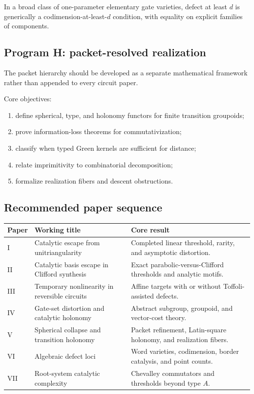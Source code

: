 \begin{conjecture}
In a broad class of one-parameter elementary gate varieties, defect at least $d$ is generically a codimension-at-least-$d$ condition, with equality on explicit families of components.
\end{conjecture}

\subsection{Program H: packet-resolved realization}
The packet hierarchy should be developed as a separate mathematical framework rather than appended to every circuit paper.

Core objectives:
\begin{enumerate}
\item define spherical, type, and holonomy functors for finite transition groupoids;
\item prove information-loss theorems for commutativization;
\item classify when typed Green kernels are sufficient for distance;
\item relate imprimitivity to combinatorial decomposition;
\item formalize realization fibers and descent obstructions.
\end{enumerate}

\subsection{Recommended paper sequence}
\begin{longtable}{@{}>{\raggedright\arraybackslash}p{}>{\raggedright\arraybackslash}p{}>{\raggedright\arraybackslash}p{}@{}}
\toprule
Paper & Working title & Core result\\
\midrule
I & Catalytic escape from unitriangularity & Completed linear threshold, rarity, and asymptotic distortion.\\
II & Catalytic basis escape in Clifford synthesis & Exact parabolic-versus-Clifford thresholds and analytic motifs.\\
III & Temporary nonlinearity in reversible circuits & Affine targets with or without Toffoli-assisted defects.\\
IV & Gate-set distortion and catalytic holonomy & Abstract subgroup, groupoid, and vector-cost theory.\\
V & Spherical collapse and transition holonomy & Packet refinement, Latin-square holonomy, and realization fibers.\\
VI & Algebraic defect loci & Word varieties, codimension, border catalysis, and point counts.\\
VII & Root-system catalytic complexity & Chevalley commutators and thresholds beyond type $A$.\\
\bottomrule
\end{longtable}


